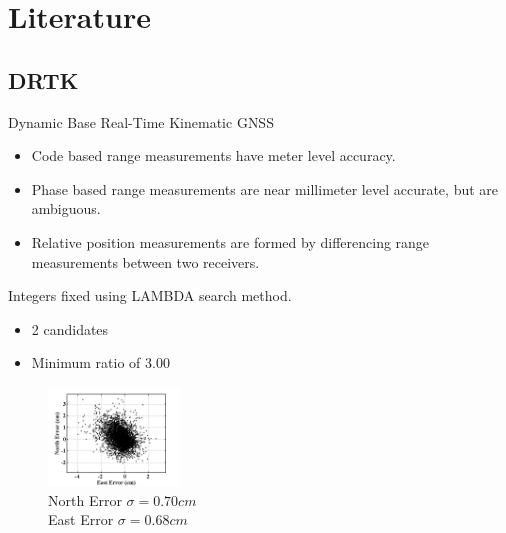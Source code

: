 \documentclass{beamer}
\begin{document}

\section{Literature}

  \subsection{DRTK}

    \begin{frame}{Dynamic Base Real-Time Kinematic GNSS}
      \begin{itemize} \footnotesize
        \item Code based range measurements have meter level accuracy.
        \item Phase based range measurements are near millimeter level accurate, but are ambiguous.
        \item Relative position measurements are formed by differencing range measurements between two receivers.
      \end{itemize}
      \begin{minipage}{0.45\linewidth}
        \small Integers fixed using LAMBDA search method.
        \begin{itemize} \footnotesize
          \item 2 candidates
          \item Minimum ratio of 3.00
        \end{itemize}
      \end{minipage}
      \begin{minipage}{0.45\linewidth}
        \begin{figure} \centering
        \includegraphics[width=3.5cm]{../graphics/drtk_errors.png}
        \caption{ \footnotesize North Error $\sigma=0.70cm$\\East Error $\sigma=0.68cm$ }
        \end{figure}
      \end{minipage}
    \end{frame}
\end{document}
